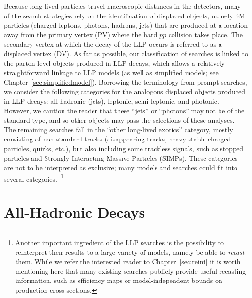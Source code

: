 Because long-lived particles travel macroscopic distances in the detectors, many of the search strategies rely on the identification of displaced objects, namely SM particles (charged leptons, photons, hadrons, jets) that are produced at a location away from the primary vertex (PV) where the hard $pp$ collision takes place. The secondary vertex at which the decay of the LLP occurs is referred to as a displaced vertex (DV). As far as possible, our classification of searches is linked to the parton-level objects produced in LLP decays, which allows a relatively straightforward linkage to LLP models (as well as simplified models; see Chapter~\ref{sec:simplifiedmodel}). Borrowing the terminology from prompt searches, we  consider the following categories for the analogous displaced objects produced in LLP decays: all-hadronic (jets), leptonic, semi-leptonic, and photonic. However, we caution the reader that these ``jets'' or ``photons'' may not be of the standard type, and so other objects may pass the selections of these analyses. The remaining searches  fall in the ``other long-lived exotics'' category, mostly consisting of non-standard tracks (disappearing tracks,  heavy stable charged particles, quirks, etc.), but also including some trackless signals, such as stopped particles and Strongly Interacting Massive Particles (SIMPs). These categories are not to be interpreted as exclusive; many models and searches could fit into several categories.~\footnote{Another important ingredient of the LLP searches is the possibility to reinterpret their results to a large variety of models, namely be able to \emph{recast} them. While we refer the interested reader to Chapter~\ref{sec:reint} it is worth mentioning here that many existing searches publicly provide useful recasting information, such as efficiency maps or model-independent bounds on production cross sections.}

\section{All-Hadronic Decays}
\label{subsec:djets}

